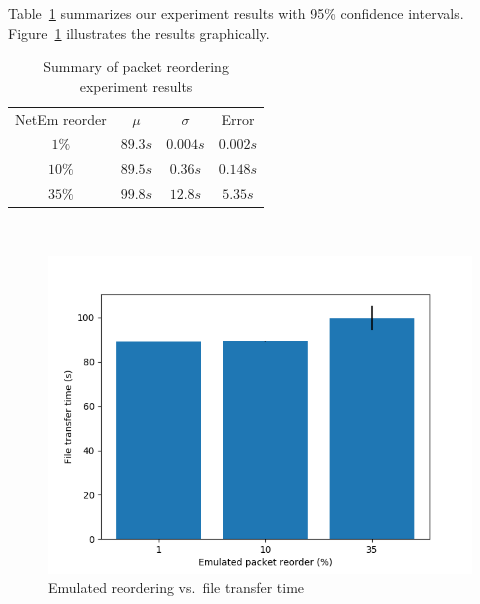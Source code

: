 \documentclass[conference]{IEEEtran}
\begin{document}
Table~\ref{table:reorder} summarizes our experiment results with 95\% confidence intervals.
Figure~\ref{fig:reorder} illustrates the results graphically.
\begin{table}
    \centering
    \begin{tabular}{c c c c}
        \toprule
        NetEm reorder & $\mu$ & $\sigma$ & Error \\
        $1\%$   &   $89.3s$   &   $0.004s$    &   $0.002s$ \\
        $10\%$   &    $89.5s$   &   $0.36s$    &   $0.148s$ \\
        $35\%$   &    $99.8s$   &   $12.8s$    &   $5.35s$ \\
        \bottomrule
    \end{tabular}\label{table:reorder} \\
    \caption{Summary of packet reordering experiment results}\label{table:reorder}
\end{table}

\begin{figure}
    \centering
    \includegraphics[scale=0.6]{graphics/plot-reorder}
    \caption{Emulated reordering vs.\ file transfer time}\label{fig:reorder}
\end{figure}
\end{document}
